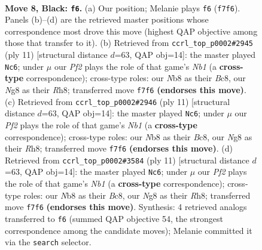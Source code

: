 \documentclass[11pt]{article}
\begin{document}
\begin{figure}[p]\centering
\begin{subfigure}{0.46\textwidth}\centering
\resizebox{\linewidth}{!}{%
\newchessgame
\chessboard[
  setfen={rn1qkbnr/3ppp1p/b5p1/2pP4/6PP/2N5/PP2PP2/R1BQKBNR b KQkq - 0 8},
  showmover=false,
  pgfstyle=straightmove, color=movearrow, markmove={f7-f6}
]}
\caption{}
\end{subfigure}\hfill
\begin{subfigure}{0.46\textwidth}\centering
\resizebox{\linewidth}{!}{%
\newchessgame
\chessboard[
  setfen={rnbqkb1r/pp2pp1p/3p1np1/8/3NPP2/2N5/PPP3PP/R1BQKB1R b KQkq - 0 6},
  showmover=false,
  pgfstyle=straightmove, color=movearrow, markmove={b8-c6}
]}
\caption{}
\end{subfigure}
\\[4pt]
\begin{subfigure}{0.46\textwidth}\centering
\resizebox{\linewidth}{!}{%
\newchessgame
\chessboard[
  setfen={rnbqkb1r/pp2pp1p/3p1np1/8/3NPP2/2N5/PPP3PP/R1BQKB1R b KQkq - 0 6},
  showmover=false,
  pgfstyle=straightmove, color=movearrow, markmove={b8-c6}
]}
\caption{}
\end{subfigure}\hfill
\begin{subfigure}{0.46\textwidth}\centering
\resizebox{\linewidth}{!}{%
\newchessgame
\chessboard[
  setfen={rnbqkb1r/pp2pp1p/3p1np1/8/3NPP2/2N5/PPP3PP/R1BQKB1R b KQkq - 0 6},
  showmover=false,
  pgfstyle=straightmove, color=movearrow, markmove={b8-c6}
]}
\caption{}
\end{subfigure}
\caption{\textbf{Move 8, Black: \texttt{f6}.} (a) Our position; Melanie plays \texttt{f6} (\texttt{f7f6}). Panels (b)--(d) are the retrieved master positions whose correspondence most drove this move (highest QAP objective among those that transfer to it). (b) Retrieved from \texttt{ccrl\_top\_p0002\#2945} (ply 11) [structural distance $d$=63, QAP obj=14]: the master played \texttt{Nc6}; under $\mu$ our \emph{Pf2} plays the role of that game's \emph{Nb1} (a \textbf{cross-type} correspondence); cross-type roles: our \emph{N}b8 as their \emph{B}c8, our \emph{N}g8 as their \emph{R}h8; transferred move \texttt{f7f6} \textbf{(endorses this move)}. (c) Retrieved from \texttt{ccrl\_top\_p0002\#2946} (ply 11) [structural distance $d$=63, QAP obj=14]: the master played \texttt{Nc6}; under $\mu$ our \emph{Pf2} plays the role of that game's \emph{Nb1} (a \textbf{cross-type} correspondence); cross-type roles: our \emph{N}b8 as their \emph{B}c8, our \emph{N}g8 as their \emph{R}h8; transferred move \texttt{f7f6} \textbf{(endorses this move)}. (d) Retrieved from \texttt{ccrl\_top\_p0002\#3584} (ply 11) [structural distance $d$=63, QAP obj=14]: the master played \texttt{Nc6}; under $\mu$ our \emph{Pf2} plays the role of that game's \emph{Nb1} (a \textbf{cross-type} correspondence); cross-type roles: our \emph{N}b8 as their \emph{B}c8, our \emph{N}g8 as their \emph{R}h8; transferred move \texttt{f7f6} \textbf{(endorses this move)}. Synthesis: 4 retrieved analogs transferred to \texttt{f6} (summed QAP objective 54, the strongest correspondence among the candidate moves); Melanie committed it via the \texttt{search} selector.}
\label{fig:thought-m15}
\end{figure}
\end{document}
